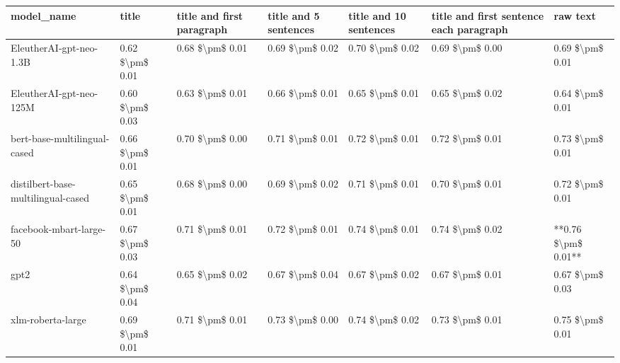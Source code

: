 \begin{tabular}{lllllll}
\toprule
                        model\_name &           title & title and first paragraph & title and 5 sentences & title and 10 sentences & title and first sentence each paragraph &            raw text \\
\midrule
           EleutherAI-gpt-neo-1.3B & 0.62 \$\textbackslash pm\$ 0.01 &           0.68 \$\textbackslash pm\$ 0.01 &       0.69 \$\textbackslash pm\$ 0.02 &        0.70 \$\textbackslash pm\$ 0.02 &                         0.69 \$\textbackslash pm\$ 0.00 &     0.69 \$\textbackslash pm\$ 0.01 \\
           EleutherAI-gpt-neo-125M & 0.60 \$\textbackslash pm\$ 0.03 &           0.63 \$\textbackslash pm\$ 0.01 &       0.66 \$\textbackslash pm\$ 0.01 &        0.65 \$\textbackslash pm\$ 0.01 &                         0.65 \$\textbackslash pm\$ 0.02 &     0.64 \$\textbackslash pm\$ 0.01 \\
      bert-base-multilingual-cased & 0.66 \$\textbackslash pm\$ 0.01 &           0.70 \$\textbackslash pm\$ 0.00 &       0.71 \$\textbackslash pm\$ 0.01 &        0.72 \$\textbackslash pm\$ 0.01 &                         0.72 \$\textbackslash pm\$ 0.01 &     0.73 \$\textbackslash pm\$ 0.01 \\
distilbert-base-multilingual-cased & 0.65 \$\textbackslash pm\$ 0.01 &           0.68 \$\textbackslash pm\$ 0.00 &       0.69 \$\textbackslash pm\$ 0.02 &        0.71 \$\textbackslash pm\$ 0.01 &                         0.70 \$\textbackslash pm\$ 0.01 &     0.72 \$\textbackslash pm\$ 0.01 \\
           facebook-mbart-large-50 & 0.67 \$\textbackslash pm\$ 0.03 &           0.71 \$\textbackslash pm\$ 0.01 &       0.72 \$\textbackslash pm\$ 0.01 &        0.74 \$\textbackslash pm\$ 0.01 &                         0.74 \$\textbackslash pm\$ 0.02 & **0.76 \$\textbackslash pm\$ 0.01** \\
                              gpt2 & 0.64 \$\textbackslash pm\$ 0.04 &           0.65 \$\textbackslash pm\$ 0.02 &       0.67 \$\textbackslash pm\$ 0.04 &        0.67 \$\textbackslash pm\$ 0.02 &                         0.67 \$\textbackslash pm\$ 0.01 &     0.67 \$\textbackslash pm\$ 0.03 \\
                 xlm-roberta-large & 0.69 \$\textbackslash pm\$ 0.01 &           0.71 \$\textbackslash pm\$ 0.01 &       0.73 \$\textbackslash pm\$ 0.00 &        0.74 \$\textbackslash pm\$ 0.02 &                         0.73 \$\textbackslash pm\$ 0.01 &     0.75 \$\textbackslash pm\$ 0.01 \\
\bottomrule
\end{tabular}
